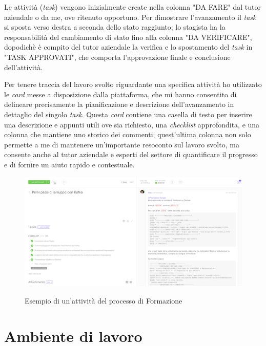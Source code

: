 Le attività (\textit{task}) vengono inizialmente create nella colonna "DA FARE" dal tutor aziendale o da me, ove ritenuto opportuno.
Per dimostrare l'avanzamento il \textit{task} si sposta verso destra a seconda dello stato raggiunto; lo stagista ha la responsabilità del cambiamento di stato fino alla colonna "DA VERIFICARE", dopodichè è compito del tutor aziendale la verifica e lo spostamento del \textit{task} in "TASK APPROVATI", che comporta l'approvazione finale e conclusione dell'attività.

Per tenere traccia del lavoro svolto riguardante una specifica attività ho utilizzato le \textit{card} messe a disposizione dalla piattaforma, che mi hanno consentito di delineare precisamente la pianificazione e descrizione dell'avanzamento in dettaglio del singolo \textit{task}.
Questa \textit{card} contiene una casella di testo per inserire una descrizione e appunti utili ove sia richiesto, una \textit{checklist} approfondita, e una colonna che mantiene uno storico dei commenti; quest'ultima colonna non solo permette a me di mantenere un'importante resoconto sul lavoro svolto, ma consente anche al tutor aziendale e esperti del settore di quantificare il progresso e di fornire un aiuto rapido e contestuale.

\begin{figure}[H]
  \includegraphics[width=\textwidth]{images/clickup_task_v2.png}\\
  \caption{Esempio di un'attività del processo di Formazione}
\end{figure}


\section{Ambiente di lavoro}

